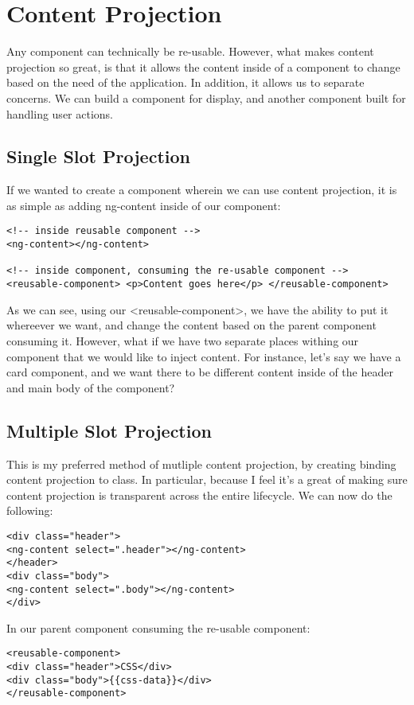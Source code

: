 \chapter{ Content Projection }


Any component can technically be re-usable. However, what makes content
projection so great, is that it allows the content inside of a component to
change based on the need of the application. In addition, it allows us to
separate concerns. We can build a component for display, and another component
built for handling user actions.

\section{ Single Slot Projection }
If we wanted to create a component wherein we can use content projection, it is
as simple as adding ng-content inside of our component:
\begin{lstlisting}
<!-- inside reusable component -->
<ng-content></ng-content>

<!-- inside component, consuming the re-usable component -->
<reusable-component> <p>Content goes here</p> </reusable-component>
\end{lstlisting}

As we can see, using our <reusable-component>, we have the ability to put it
whereever we want, and change the content based on the parent component
consuming it. However, what if we have two separate places withing our
component that we would like to inject content. For instance, let's say we have
a card component, and we want there to be different content inside of the header
and main body of the component?

\section{ Multiple Slot Projection }
This is my preferred method of mutliple content projection, by creating binding
content projection to class. In particular, because I feel it's a great of
making sure content projection is transparent across the entire lifecycle. We
can now do the following:

\begin{lstlisting}
<div class="header">
<ng-content select=".header"></ng-content>
</header>
<div class="body">
<ng-content select=".body"></ng-content>
</div>
\end{lstlisting}

In our parent component consuming the re-usable component:
\begin{lstlisting}
<reusable-component>
<div class="header">CSS</div>
<div class="body">{{css-data}}</div>
</reusable-component>
\end{lstlisting}

